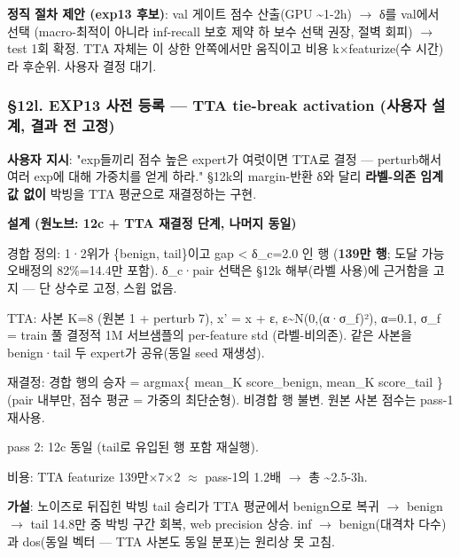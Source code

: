 \textbf{정직 절차 제안 (exp13 후보)}: val 게이트 점수 산출(GPU \textasciitilde{}1-2h)  \ensuremath{\rightarrow}  δ를 val에서 선택 (macro-최적이 아니라 inf-recall 보호 제약 하 보수 선택 권장, 절벽 회피)  \ensuremath{\rightarrow}  test 1회 확정. TTA 자체는 이 상한 안쪽에서만 움직이고 비용 k×featurize(수 시간)라 후순위. 사용자 결정 대기.

\subsubsection{§12l. EXP13 사전 등록 — TTA tie-break activation (사용자 설계, 결과 전 고정)}
\textbf{사용자 지시}: "exp들끼리 점수 높은 expert가 여럿이면 TTA로 결정 — perturb해서 여러 exp에 대해 가중치를 얻게 하라." §12k의 margin-반환 δ와 달리 \textbf{라벨-의존 임계값 없이} 박빙을 TTA 평균으로 재결정하는 구현.

\textbf{설계 (원노브: 12c +\allowbreak{} TTA 재결정 단계, 나머지 동일)}

\par\noindent \textbullet\enspace 경합 정의: 1·2위가 \{benign, tail\}이고 gap < δ\_\allowbreak{}c=\allowbreak{}2.0 인 행 (\textbf{139만 행}; 도달 가능 오배정의 82\%=\allowbreak{}14.4만 포함). δ\_\allowbreak{}c·pair 선택은 §12k 해부(라벨 사용)에 근거함을 고지 — 단 상수로 고정, 스윕 없음.


\par\noindent \textbullet\enspace TTA: 사본 K=\allowbreak{}8 (원본 1 +\allowbreak{} perturb 7), x' =\allowbreak{} x +\allowbreak{} ε, ε\textasciitilde{}N(0,(α·σ\_\allowbreak{}f)²), α=\allowbreak{}0.1, σ\_\allowbreak{}f =\allowbreak{} train 풀 결정적 1M 서브샘플의 per-feature std (라벨-비의존). 같은 사본을 benign·tail 두 expert가 공유(동일 seed 재생성).


\par\noindent \textbullet\enspace 재결정: 경합 행의 승자 =\allowbreak{} argmax\{ mean\_\allowbreak{}K score\_\allowbreak{}benign, mean\_\allowbreak{}K score\_\allowbreak{}tail \} (pair 내부만, 점수 평균 =\allowbreak{} 가중의 최단순형). 비경합 행 불변. 원본 사본 점수는 pass-1 재사용.


\par\noindent \textbullet\enspace pass 2: 12c 동일 (tail로 유입된 행 포함 재실행).


\par\noindent \textbullet\enspace 비용: TTA featurize 139만×7×2 \ensuremath{\approx} pass-1의 1.2배  \ensuremath{\rightarrow}  총 \textasciitilde{}2.5-3h.


\textbf{가설}: 노이즈로 뒤집힌 박빙 tail 승리가 TTA 평균에서 benign으로 복귀  \ensuremath{\rightarrow}  benign \ensuremath{\rightarrow} tail 14.8만 중 박빙 구간 회복, web precision 상승. inf \ensuremath{\rightarrow} benign(대격차 다수)과 dos(동일 벡터 — TTA 사본도 동일 분포)는 원리상 못 고침.

